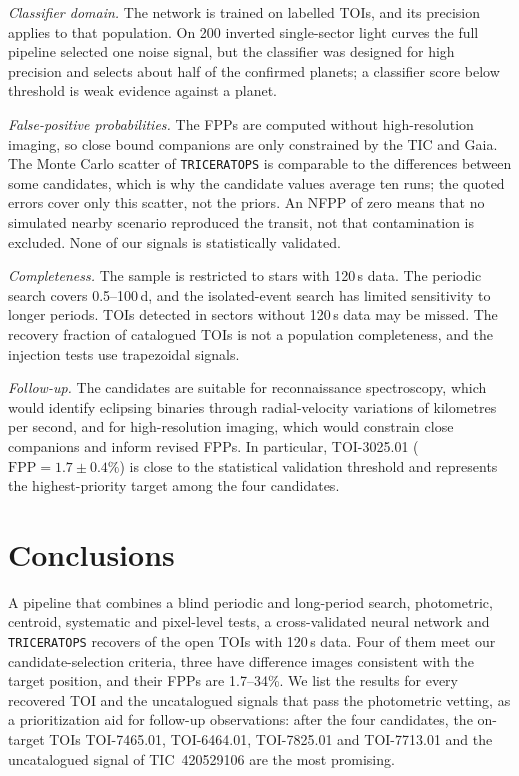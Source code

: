 \documentclass{aastex701}
\begin{document}
\textit{Classifier domain.} The network is trained on labelled TOIs, and its precision
applies to that population. On 200 inverted single-sector light curves
the full pipeline selected one noise signal, but the classifier was designed for high precision and
selects about half of the confirmed planets; a classifier score below threshold is weak evidence
against a planet.

\textit{False-positive probabilities.} The FPPs are computed without high-resolution imaging, so
close bound companions are only constrained by the TIC and Gaia. The Monte Carlo scatter of
\texttt{TRICERATOPS} is comparable to the differences between some candidates, which is why the
candidate values average ten runs; the quoted errors cover only this scatter, not the priors. An
NFPP of zero means that no simulated nearby scenario reproduced the transit, not that contamination
is excluded. None of our signals is statistically validated.

\textit{Completeness.} The sample is restricted to stars with 120\,s data. The periodic search covers
0.5--100\,d, and the isolated-event search has limited sensitivity to longer periods.
TOIs detected in sectors without 120\,s data may be missed. The recovery fraction of catalogued
TOIs is not a population completeness, and the injection tests use trapezoidal signals.

\textit{Follow-up.} The candidates are suitable for reconnaissance spectroscopy, which would identify
eclipsing binaries through radial-velocity variations of kilometres per second, and for
high-resolution imaging, which would constrain close companions and inform revised FPPs. In
particular, TOI-3025.01 ($\mathrm{FPP}=1.7\pm0.4\%$) is close to the statistical validation threshold
and represents the highest-priority target among the four candidates.

\section{Conclusions}\label{sec:conclusions}
A pipeline that combines a blind periodic and long-period search, photometric, centroid,
systematic and pixel-level tests, a cross-validated neural network and \texttt{TRICERATOPS} recovers
\nRecovered{} of the \nOpen{} open TOIs with 120\,s data. Four of them
meet our candidate-selection criteria, three have difference images consistent with the target
position, and their FPPs
are 1.7--34\%. We list the
results for every recovered TOI and the uncatalogued signals that pass the photometric vetting, as a
prioritization aid for follow-up observations: after the four candidates, the on-target TOIs
TOI-7465.01, TOI-6464.01, TOI-7825.01 and TOI-7713.01 and the uncatalogued signal of TIC~420529106
are the most promising.
\end{document}
